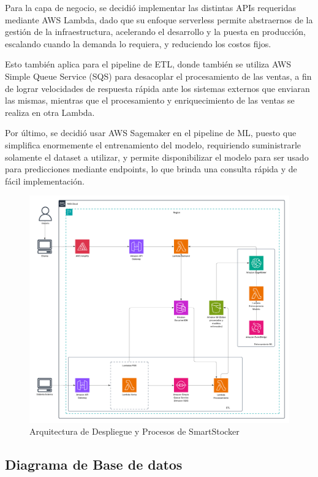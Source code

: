 Para la capa de negocio, se decidió implementar las distintas APIs requeridas mediante AWS Lambda, dado que su enfoque serverless permite abstraernos de la gestión de la infraestructura, acelerando el desarrollo y la puesta en producción, escalando cuando la demanda lo requiera, y reduciendo los costos fijos.

Esto también aplica para el pipeline de ETL, donde también se utiliza AWS Simple Queue Service (SQS) para desacoplar el procesamiento de las ventas, a fin de lograr velocidades de respuesta rápida ante los sistemas externos que enviaran las mismas, mientras que el procesamiento y enriquecimiento de las ventas se realiza en otra Lambda.

Por último, se decidió usar AWS Sagemaker en el pipeline de ML, puesto que simplifica enormemente el entrenamiento del modelo, requiriendo suministrarle solamente el dataset a utilizar, y permite disponibilizar el modelo para ser usado para predicciones mediante endpoints, lo que brinda una consulta rápida y de fácil implementación.

\begin{figure}[htbp]
    \centering
    \includegraphics[width=1\textwidth]{images/arquitectura_despliegue.png}
    \caption{Arquitectura de Despliegue y Procesos de SmartStocker}
    \label{fig:arquitectura-despliegue}
\end{figure}

\subsection{Diagrama de Base de datos}\label{sec:arquitectura-base-datos}

